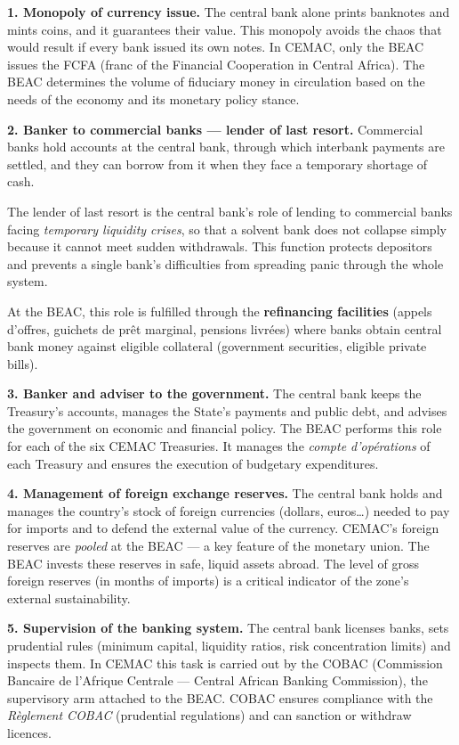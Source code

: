 \documentclass[11pt]{article}
\newcommand{\cle}[1]{{\popxbold\color{popdark}#1}}
\begin{document}
\textbf{1. Monopoly of currency issue.} The central bank alone prints banknotes and mints coins, and it guarantees their value. This monopoly avoids the chaos that would result if every bank issued its own notes. In CEMAC, only the BEAC issues the \cle{FCFA} (franc of the Financial Cooperation in Central Africa). The BEAC determines the volume of fiduciary money in circulation based on the needs of the economy and its monetary policy stance.

\textbf{2. Banker to commercial banks — lender of last resort.} Commercial banks hold accounts at the central bank, through which interbank payments are settled, and they can borrow from it when they face a temporary shortage of cash.

\begin{definition}
The \cle{lender of last resort} is the central bank's role of lending to commercial banks facing \emph{temporary liquidity crises}, so that a solvent bank does not collapse simply because it cannot meet sudden withdrawals. This function protects depositors and prevents a single bank's difficulties from spreading panic through the whole system.
\end{definition}

At the BEAC, this role is fulfilled through the \textbf{refinancing facilities} (appels d'offres, guichets de prêt marginal, pensions livrées) where banks obtain central bank money against eligible collateral (government securities, eligible private bills).

\textbf{3. Banker and adviser to the government.} The central bank keeps the Treasury's accounts, manages the State's payments and public debt, and advises the government on economic and financial policy. The BEAC performs this role for each of the six CEMAC Treasuries. It manages the \emph{compte d'opérations} of each Treasury and ensures the execution of budgetary expenditures.

\textbf{4. Management of foreign exchange reserves.} The central bank holds and manages the country's stock of foreign currencies (dollars, euros\ldots) needed to pay for imports and to defend the external value of the currency. CEMAC's foreign reserves are \emph{pooled} at the BEAC — a key feature of the monetary union. The BEAC invests these reserves in safe, liquid assets abroad. The level of gross foreign reserves (in months of imports) is a critical indicator of the zone's external sustainability.

\textbf{5. Supervision of the banking system.} The central bank licenses banks, sets prudential rules (minimum capital, liquidity ratios, risk concentration limits) and inspects them. In CEMAC this task is carried out by the \cle{COBAC} (Commission Bancaire de l'Afrique Centrale — Central African Banking Commission), the supervisory arm attached to the BEAC. COBAC ensures compliance with the \emph{Règlement COBAC} (prudential regulations) and can sanction or withdraw licences.
\end{document}
